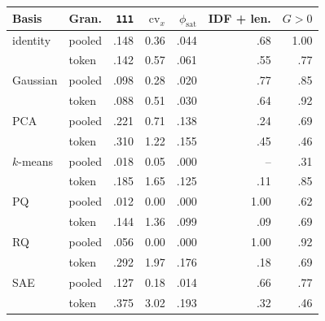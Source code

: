 \begin{tabular}{@{}llrrrrr@{}}
\toprule
Basis & Gran. & \texttt{111} & $\mathrm{cv}_x$ & $\phi_{\mathrm{sat}}$ & IDF + len. & $G > 0$ \\
\midrule
identity & pooled & .148 & 0.36 & .044 & .68 & 1.00 \\
 & token & .142 & 0.57 & .061 & .55 & .77 \\
Gaussian & pooled & .098 & 0.28 & .020 & .77 & .85 \\
 & token & .088 & 0.51 & .030 & .64 & .92 \\
PCA & pooled & .221 & 0.71 & .138 & .24 & .69 \\
 & token & .310 & 1.22 & .155 & .45 & .46 \\
$k$-means & pooled & .018 & 0.05 & .000 & -- & .31 \\
 & token & .185 & 1.65 & .125 & .11 & .85 \\
PQ & pooled & .012 & 0.00 & .000 & 1.00 & .62 \\
 & token & .144 & 1.36 & .099 & .09 & .69 \\
RQ & pooled & .056 & 0.00 & .000 & 1.00 & .92 \\
 & token & .292 & 1.97 & .176 & .18 & .69 \\
SAE & pooled & .127 & 0.18 & .014 & .66 & .77 \\
 & token & .375 & 3.02 & .193 & .32 & .46 \\
\bottomrule
\end{tabular}

